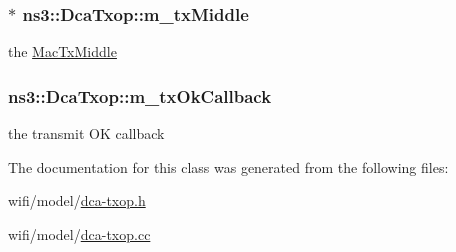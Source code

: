 \subsubsection[{\texorpdfstring{m\+\_\+tx\+Middle}{m_txMiddle}}]{$\ast$ ns3\+::\+Dca\+Txop\+::m\+\_\+tx\+Middle\hspace{0.3cm}{\ttfamily [protected]}}\hypertarget{classns3_1_1DcaTxop_a605ac1de505d652e229d14a9e75c7b1a}{}\label{classns3_1_1DcaTxop_a605ac1de505d652e229d14a9e75c7b1a}


the \hyperlink{classns3_1_1MacTxMiddle}{Mac\+Tx\+Middle} 

\subsubsection[{\texorpdfstring{m\+\_\+tx\+Ok\+Callback}{m_txOkCallback}}]{ ns3\+::\+Dca\+Txop\+::m\+\_\+tx\+Ok\+Callback\hspace{0.3cm}{\ttfamily [protected]}}\hypertarget{classns3_1_1DcaTxop_a0d37805f9e520da7a15dee3f66c2bfd5}{}\label{classns3_1_1DcaTxop_a0d37805f9e520da7a15dee3f66c2bfd5}


the transmit OK callback 



The documentation for this class was generated from the following files\+:\begin{DoxyCompactItemize}
\item 
wifi/model/\hyperlink{dca-txop_8h}{dca-\/txop.\+h}\item 
wifi/model/\hyperlink{dca-txop_8cc}{dca-\/txop.\+cc}\end{DoxyCompactItemize}
